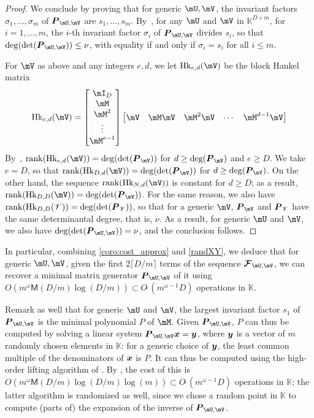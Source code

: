 \documentclass[12pt]{article}
\newcommand{\mat}[1]{\bm{\MakeUppercase{#1}}} %
\newcommand{\col}[1]{\bm{\MakeLowercase{#1}}} %
\newcommand{\seq}{\mat{\mathcal{F}}} %
\newcommand{\softO}[1]{O{\tilde{~}}(#1)} %
\newcommand{\minpoly}{P}
\def\M {\ensuremath{\mathsf{M}}}
\def\K{\mathbb{K}}
\def\K {\ensuremath{\mathbb{K}}}
\def\scrV {\ensuremath{\mathscr{V}}}
\begin{document}
\begin{proof}
  We conclude by proving that for generic $\mU,\mV$, the invariant
  factors $\sigma_1,\dots,\sigma_m$ of $\mat{P}_{\mU,\mV}$ are
  $s_1,\dots,s_m$.  By~\cite[Theorem~2.12]{KaVi04}, for any $\mU$ and
  $\mV$ in $\K^{D\times m}$, for $i=1,\dots,m$, the $i$-th invariant
  factor $\sigma_i$ of $\mat{P}_{\mU,\mV}$ divides $s_i$, so that
  $\deg(\det(\mat{P}_{\mU,\mV}))\le\nu$, with equality if and only
  if $\sigma_i=s_i$ for all $i \le m$.
	
  For $\mV$ as above and any integers $e,d$, we let ${\rm
    Hk}_{e,d}(\mV)$ be the block Hankel matrix
  $$ {\rm Hk}_{e,d}(\mV) =
  \begin{bmatrix}
    \mI_D \\  \mM \\  \mM^2 \\ \vdots  \\  \mM^{e-1}
  \end{bmatrix}
  \begin{bmatrix}
    \mV & \mM\mV & \mM^2\mV &\cdots& \mM^{d-1}\mV
  \end{bmatrix}
  $$ By~\cite[Eq.~(2.6)]{KaVi04}, ${\rm rank}({\rm Hk}_{e,d}(\mV)) =
  \deg(\det(\mat{P}_{\mV}))$ for $d \ge \deg(\mat{P}_{\mV})$
  and $e \ge D$.  We take $e=D$, so that ${\rm rank}({\rm
    Hk}_{D,d}(\mV)) = \deg(\det(\mat{P}_{\mV}))$ for $d \ge
  \deg(\mat{P}_{\mV})$. On the other hand, the sequence ${\rm
    rank}({\rm Hk}_{N,d}(\mV))$ is constant for $d \ge D$; as a
  result, ${\rm rank}({\rm Hk}_{D,D}(\mV)) =
  \deg(\det(\mat{P}_{\mV}))$. For the same reason, we also have ${\rm
    rank}({\rm Hk}_{D,D}(\scrV)) = \deg(\det(\mat{P}_{\scrV}))$, so that
  for a generic $\mV$, $\mat{P}_{\mV}$ and $\mat{P}_{\scrV}$
  have the same determinantal degree, that is, $\nu$.  As a result,
  for generic $\mU$ and $\mV$, we also have
  $\deg(\det(\mat{P}_{\mU,\mV}))=\nu$, and the conclusion follows.
\end{proof} 

In particular, combining \cref{coro:cost_approx} and \cref{randXY}, we
deduce that for generic $\mU,\mV$, given the first $2 \lceil D/m
\rceil$ terms of the sequence $\seq_{\mU,\mV}$, we can recover a
minimal matrix generator  $\mat{P}_{\mU,\mV}$ of it using $O(m^\omega \M(D/m) \log(D/m))
\subset \softO{m^{\omega-1} D}$ operations in $\K$.

Remark as well that for generic $\mU$ and $\mV$, the largest invariant
factor $s_1$ of $\mat{P}_{\mU,\mV}$ is the minimal polynomial
$\minpoly$ of $\mM$.  Given $\mat{P}_{\mU,\mV}$, $\minpoly$ can thus
be computed by solving a linear system $\mat{P}_{\mU,\mV} \col{x} =
\col{y}$, where $\col{y}$ is a vector of $m$ randomly chosen elements
in $\K$: for a generic choice of $\col{y}$, the least common multiple
of the denominators of $\col{x}$ is $\minpoly$.  It can thus be
computed using the high-order lifting algorithm of
\cite[Algorithm~5]{Stor03}.  By \cite[Corollary~16]{Stor03}, the cost
of this is $O(m^{\omega} \M(D/m) \log(D/m) \log(m)) \subset
\softO{m^{\omega-1}D}$ operations in $\K$; the latter algorithm is
randomized as well, since we chose a random point in $\K$ to compute
(parts of) the expansion of the inverse of $\mat{P}_{\mU,\mV}$.
\end{document}

